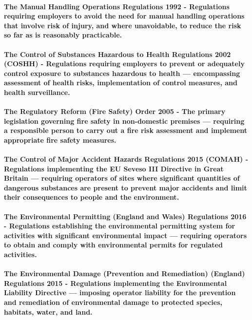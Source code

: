 \paragraph{\textbf{The Manual Handling Operations Regulations 1992} - Regulations requiring employers to avoid the need for manual handling operations that involve risk of injury, and where unavoidable, to reduce the risk so far as is reasonably practicable.}
\paragraph{\textbf{The Control of Substances Hazardous to Health Regulations 2002 (COSHH)} - Regulations requiring employers to prevent or adequately control exposure to substances hazardous to health — encompassing assessment of health risks, implementation of control measures, and health surveillance.}
\paragraph{\textbf{The Regulatory Reform (Fire Safety) Order 2005} - The primary legislation governing fire safety in non-domestic premises — requiring a responsible person to carry out a fire risk assessment and implement appropriate fire safety measures.}
\paragraph{\textbf{The Control of Major Accident Hazards Regulations 2015 (COMAH)} - Regulations implementing the EU Seveso III Directive in Great Britain — requiring operators of sites where significant quantities of dangerous substances are present to prevent major accidents and limit their consequences to people and the environment.}
\paragraph{\textbf{The Environmental Permitting (England and Wales) Regulations 2016} - Regulations establishing the environmental permitting system for activities with significant environmental impact — requiring operators to obtain and comply with environmental permits for regulated activities.}
\paragraph{\textbf{The Environmental Damage (Prevention and Remediation) (England) Regulations 2015} - Regulations implementing the Environmental Liability Directive — imposing operator liability for the prevention and remediation of environmental damage to protected species, habitats, water, and land.}
